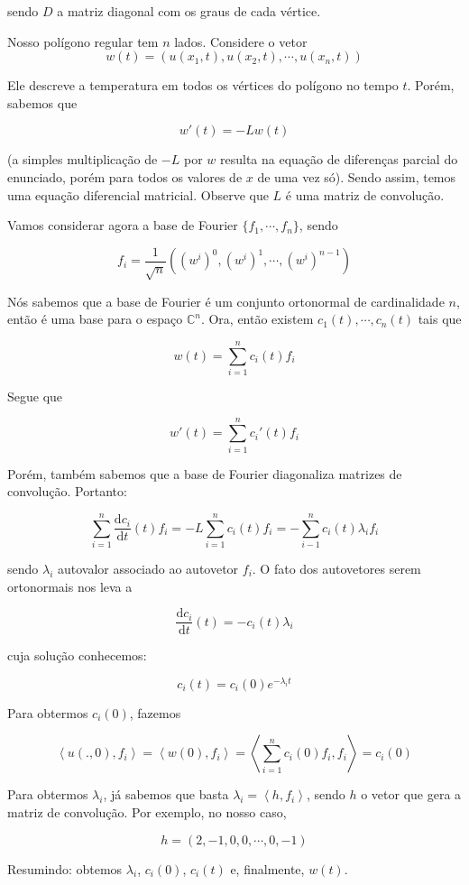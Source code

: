 \documentclass{article}
\begin{document}
\begin{enumerate}
                sendo $D$ a matriz diagonal com os graus de cada vértice.

                Nosso polígono regular tem $n$ lados. Considere o vetor $$w(t) = (u(x_1, t), u(x_2, t), \cdots, u(x_n, t))$$

                Ele descreve a temperatura em todos os vértices do polígono no tempo $t$.
                Porém, sabemos que

                $$w'(t) = -L w(t)$$

                (a simples multiplicação de $-L$ por $w$ resulta na equação de diferenças parcial do enunciado,
                porém para todos os valores de $x$ de uma vez só).
                Sendo assim, temos uma equação diferencial matricial.
                Observe que $L$ é uma matriz de convolução.
                
                Vamos considerar agora a base de Fourier $\{f_1, \cdots, f_n\}$, sendo

                $$f_i = \dfrac{1}{\sqrt{n}} \left((w^i)^0, (w^i)^1, \cdots, (w^i)^{n-1}\right)$$

                Nós sabemos que a base de Fourier é um conjunto ortonormal de cardinalidade $n$, então é uma base para o espaço
                $\mathbb{C}^n$. Ora, então existem $c_1(t), \cdots, c_n(t)$ tais que

                $$w(t) = \sum_{i=1}^n c_i(t)f_i$$

                Segue que

                $$w'(t) = \sum_{i=1}^n c_i'(t)f_i$$

                Porém, também sabemos que a base de Fourier diagonaliza matrizes de convolução. Portanto:

                $$\sum_{i=1}^n \dfrac{\mathrm{d}c_i}{\mathrm{d}t}(t)f_i = -L\sum_{i=1}^nc_i(t)f_i = -\sum_{i-1}^n c_i(t)\lambda_if_i$$

                sendo $\lambda_i$ autovalor associado ao autovetor $f_i$.
                O fato dos autovetores serem ortonormais nos leva a

                $$\dfrac{\mathrm{d}c_i}{\mathrm{d}t}(t) = -c_i(t)\lambda_i$$

                cuja solução conhecemos:

                $$c_i(t) = c_i(0) e^{-\lambda_i t}$$

                Para obtermos $c_i(0)$, fazemos

                $$\left<u(., 0), f_i\right> = \left<w(0), f_i\right> = \left<\sum_{i=1}^n c_i(0)f_i, f_i\right> = c_i(0)$$

                Para obtermos $\lambda_i$, já sabemos que basta $\lambda_i = \left<h, f_i\right>$,
                sendo $h$ o vetor que gera a matriz de convolução. Por exemplo, no nosso caso,

                $$h = (2, -1, 0, 0, \cdots, 0, -1)$$

                Resumindo: obtemos $\lambda_i$, $c_i(0)$, $c_i(t)$ e, finalmente, $w(t)$.
        \end{enumerate}
\end{document}
